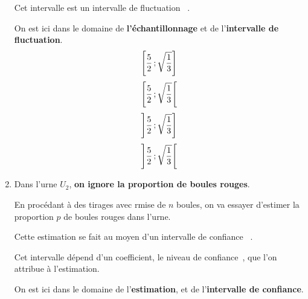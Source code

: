 \documentclass[12pt,french]{book}
\begin{document}
\begin{spacing}{1.2}
\begin{enumerate}
\begin{minipage}{0.45\linewidth}
\end{minipage}


Cet intervalle est un \og intervalle de fluctuation \fg~.

On est ici dans le domaine de \textbf{l'échantillonnage} et de l'\textbf{intervalle de fluctuation}.
\[\left[\dfrac{5}{2}\,;\sqrt{\dfrac{1}{3}}\right]\]
\[\left[\dfrac{5}{2}\,;\sqrt{\dfrac{1}{3}}\right[\]
\[\left]\dfrac{5}{2}\,;\sqrt{\dfrac{1}{3}}\right]\]
\[\left]\dfrac{5}{2}\,;\sqrt{\dfrac{1}{3}}\right[\]

\begin{center}
\end{center}

\item Dans l'urne $U_2$, \textbf{on ignore la proportion de boules rouges}.

En procédant à des tirages avec rmise de $n$ boules, on va essayer d'estimer la proportion $p$ de boules rouges dans l'urne.

Cette estimation se fait au moyen d'un \og intervalle de confiance \fg~.

Cet intervalle dépend d'un coefficient, le \og niveau de confiance\fg~, que l'on attribue à l'estimation.

On est ici dans le domaine de l'\textbf{estimation}, et de l'\textbf{intervalle de confiance}.


\end{enumerate}
\end{spacing}
\end{document}
